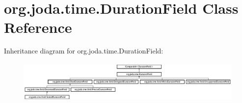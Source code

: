 \hypertarget{classorg_1_1joda_1_1time_1_1_duration_field}{\section{org.\-joda.\-time.\-Duration\-Field Class Reference}
\label{classorg_1_1joda_1_1time_1_1_duration_field}
}
Inheritance diagram for org.\-joda.\-time.\-Duration\-Field\-:\begin{figure}[H]
\begin{center}
\leavevmode
\includegraphics[height=2.058824cm]{classorg_1_1joda_1_1time_1_1_duration_field}
\end{center}
\end{figure}
